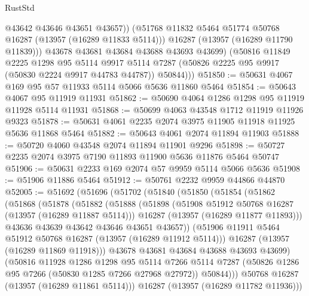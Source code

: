 \begin{lexlean}{RustStd}
\begin{coremodule}
                @43642
                @43646
                @43651
                @43657))
            (@51768 @11832 @5464 @51774 @50768 @16287 (@13957 (@16289 @11833 @5114)))
            @16287
            (@13957 (@16289 @11790 @11839)))
          @43678
          @43681
          @43684
          @43688
          @43693
          @43699)
        (@50816
          @11849
          @2225
          @1298
          @95
          @5114
          @9917
          @5114
          @7287
          (@50826 @2225 @95 @9917 (@50830 @2224 @9917 @44783 @44787))
          @50844)))
@51850 := @50631 @4067 @169 @95 @57 @11933 @5114 @5066 @5636 @11860 @5464
@51854 := @50643 @4067 @95 @11919 @11931
@51862 := @50690 @4064 @1286 @1298 @95 @11919 @11928 @5114 @11931
@51868 := @50699 @4063 @43548 @1712 @11919 @11926 @9323
@51878 := @50631 @4061 @2235 @2074 @3975 @11905 @11918 @11925 @5636 @11868 @5464
@51882 := @50643 @4061 @2074 @11894 @11903
@51888 := @50720 @4060 @43548 @2074 @11894 @11901 @9296
@51898 := @50727 @2235 @2074 @3975 @7190 @11893 @11900 @5636 @11876 @5464 @50747
@51906 := @50631 @2233 @169 @2074 @57 @9959 @5114 @5066 @5636
@51908 := @51906 @11886 @5464
@51912 := @50761 @2232 @9959 @44866 @44870
@52005 := @51692
    (@51696
      (@51702
        (@51840
          (@51850
            (@51854
              (@51862
                (@51868
                  (@51878
                    (@51882
                      (@51888
                        (@51898
                          (@51908 @51912 @50768 @16287 (@13957 (@16289 @11887 @5114)))
                          @16287
                          (@13957 (@16289 @11877 @11893)))
                        @43636
                        @43639
                        @43642
                        @43646
                        @43651
                        @43657))
                    (@51906 @11911 @5464 @51912 @50768 @16287 (@13957 (@16289 @11912 @5114)))
                    @16287
                    (@13957 (@16289 @11869 @11918)))
                  @43678
                  @43681
                  @43684
                  @43688
                  @43693
                  @43699)
                (@50816
                  @11928
                  @1286
                  @1298
                  @95
                  @5114
                  @7266
                  @5114
                  @7287
                  (@50826 @1286 @95 @7266 (@50830 @1285 @7266 @27968 @27972))
                  @50844)))
            @50768
            @16287
            (@13957 (@16289 @11861 @5114)))
          @16287
          (@13957 (@16289 @11782 @11936)))

\end{coremodule}
\end{lexlean}
